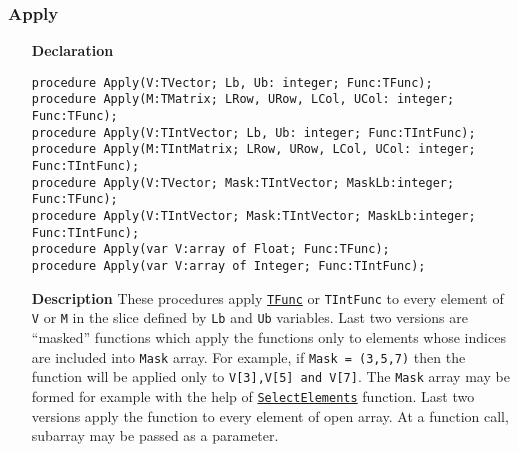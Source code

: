 \documentclass[12pt,a4paper,oneside]{report}
\newcommand{\declarationitem}[1]{\textbf{#1}}
\newcommand{\descriptiontitle}[1]{\textbf{#1}}
\newcommand{\code}[1]{\texttt{#1}}
\begin{document}
\subsubsection{Apply}
\label{uvecutils:apply}
\begin{itemize}
	\item[\declarationitem{Declaration}\hfill]
\begin{flushleft}	\code{procedure Apply(V:TVector; Lb, Ub: integer; Func:TFunc);\\ \vspace{4pt}
	procedure Apply(M:TMatrix; LRow, URow, LCol, UCol: integer; Func:TFunc); \\ \vspace{4pt}
	procedure Apply(V:TIntVector; Lb, Ub: integer; Func:TIntFunc);\\ \vspace{4pt}
	procedure Apply(M:TIntMatrix; LRow, URow, LCol, UCol: integer; Func:TIntFunc);\\ \vspace{6pt}
	procedure Apply(V:TVector; Mask:TIntVector; MaskLb:integer; Func:TFunc);\\ \vspace{4pt}
	procedure Apply(V:TIntVector; Mask:TIntVector; MaskLb:integer; Func:TIntFunc);\\  \vspace{4pt}
	procedure Apply(var V:array of Float; Func:TFunc);\\  \vspace{4pt}
	procedure Apply(var V:array of Integer; Func:TIntFunc);\\ \vspace{4pt}
}
\end{flushleft}	\item[\descriptiontitle{Description}]
	These procedures apply \hyperref[utypes-TFunc]{\code{TFunc}} or \code{TIntFunc} to every element of \code{V} or \code{M} in the slice defined by \code{Lb} and \code{Ub} variables. Last two versions are ``masked'' functions which apply the functions only to elements whose indices are included into \code{Mask} array.
	For example, if \code{Mask = (3,5,7)} then the function will be applied only to \code{V[3],V[5] and V[7]}. The \code{Mask} array may be formed for example with the help of \hyperref[uvecutils:SelElements]{\code{SelectElements}} function. Last two versions apply the function to every element of open array. At a function call, subarray may be passed as a parameter.
\end{itemize}
\end{document}
